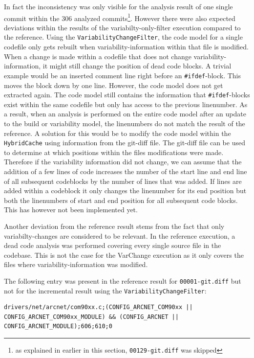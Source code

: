 \documentclass[a4paper]{article}
\begin{document}
In fact the inconsistency was only visible for the analysis result of one single commit within the 306 analyzed commits\footnote{as explained in earlier in this section, \texttt{00129-git.diff} was skipped}. However there were also expected deviations within the results of the variabilty-only-filter execution compared to the reference. Using the \texttt{Variability\-Change\-Filter}, the code model for a single codefile only gets rebuilt when variability-information within that file is modified. When a change is made within a codefile that does not change variability-information, it might still change the position of dead code blocks. A trivial example would be an inserted comment line right before an \texttt{\#ifdef}-block. This moves the block down by one line. However, the code model does not get extracted again. The code model still contains the information that \texttt{\#ifdef}-blocks exist within the same codefile but only has access to the previous linenumber. As a result, when an analysis is performed on the entire code model after an update to the build or variability model, the linenumbers do not match the result of the reference. A solution for this would be to modify the code model within the \texttt{Hybrid\-Cache} using information from the git-diff file. The git-diff file can be used to determine at which positions within the files modifications were made. Therefore if the variability information did not change, we can assume that the addition of a few lines of code increases the number of the start line and end line of all subsequent codeblocks by the number of lines that was added. If lines are added within a codeblock it only changes the linenumber for its end position but both the linenumbers of start and end position for all subsequent code blocks. This has however not been implemented yet.

Another deviation from the reference result stems from the fact that only variabilty-changes are considered to be relevant. In the reference execution, a dead code analysis was performed covering every single source file in the codebase. This is not the case for the VarChange execution as it only covers the files where variability-information was modified.

The following entry was present in the reference result for \texttt{00001-git.diff} but not for the incremental result using the \texttt{VariabilityChangeFilter}:

\begin{lstlisting}
drivers/net/arcnet/com90xx.c;(CONFIG_ARCNET_COM90xx || CONFIG_ARCNET_COM90xx_MODULE) && (CONFIG_ARCNET || CONFIG_ARCNET_MODULE);606;610;0
\end{lstlisting}
\end{document}
